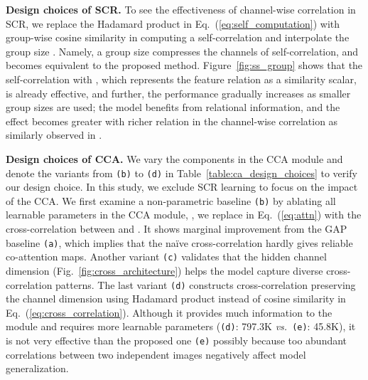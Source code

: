 \documentclass[10pt,twocolumn,letterpaper]{article}
\newcommand{\ours}{RENet\xspace}
\newcommand{\abbself}{SCR\xspace}
\newcommand{\abbcross}{CCA\xspace}
\newcommand{\smallbreakparagraph}[1]{\smallbreak \noindent \textbf{#1}}
\begin{document}
\smallbreakparagraph{Design choices of \abbself.} 
To see the effectiveness of channel-wise correlation in \abbself, we replace the Hadamard product in Eq.~(\ref{eq:self_computation}) with group-wise cosine similarity in computing a self-correlation  and interpolate the group size .
Namely, a group size  compresses the channels of self-correlation, and  becomes equivalent to the proposed method.
Figure~\ref{fig:ss_group} shows that the self-correlation with , which represents the feature relation as a similarity scalar, is already effective, and further, the performance gradually increases as smaller group sizes are used; 
the model benefits from relational information, and the effect becomes greater with richer relation in the channel-wise correlation as similarly observed in \cite{zhao2020exploring}. 







\smallbreakparagraph{Design choices of \abbcross.} 
We vary the components in the \abbcross module and denote the variants from \texttt{(b)} to \texttt{(d)} in Table~\ref{table:ca_design_choices} to verify our design choice.
In this study, we exclude \abbself learning to focus on the impact of the \abbcross.
We first examine a non-parametric baseline \texttt{(b)} by ablating all learnable parameters in the \abbcross module, \ie, we replace  in Eq.~(\ref{eq:attn}) with the cross-correlation between  and .
It shows marginal improvement from the GAP baseline \texttt{(a)}, which implies that the na\"ive cross-correlation hardly gives reliable co-attention maps.
Another variant \texttt{(c)} validates that the hidden channel dimension  (Fig.~\ref{fig:cross_architecture}) helps the model capture diverse cross-correlation patterns.
The last variant \texttt{(d)} constructs cross-correlation preserving the channel dimension using Hadamard product instead of cosine similarity in Eq.~(\ref{eq:cross_correlation}).
Although it provides much information to the module and requires more learnable parameters (\texttt{(d)}: 797.3K {\em vs.}\  \texttt{(e)}: 45.8K), it is not very effective than the proposed one \texttt{(e)} possibly because too abundant correlations between two independent images negatively affect model generalization.








\begin{figure*}[t!]
\centering
{}
\vspace{-5mm}
\caption{\textbf{Effects of \ours}.
\textbf{(a)}: Channel activation of base representation.
\textbf{(b)}: Channel activation of \abbself.
\textbf{(c)}: Attention map of \abbcross.
\label{fig:qual_main}}
\vspace{-3mm}
\end{figure*}
\end{document}
